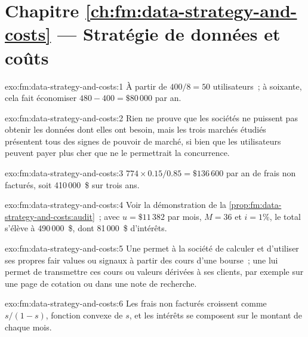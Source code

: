 \section*{Chapitre \ref{ch:fm:data-strategy-and-costs} --- Stratégie de données et coûts}

\begin{solution}{exo:fm:data-strategy-and-costs:1}
À partir de $400/8=50$ utilisateurs~; à soixante, cela fait économiser $480-400=\$80\,000$ par an.
\end{solution}

\begin{solution}{exo:fm:data-strategy-and-costs:2}
Rien ne prouve que les sociétés ne puissent pas obtenir les données dont elles ont besoin, mais les trois marchés étudiés présentent tous des signes de pouvoir de marché, si bien que les utilisateurs peuvent
payer plus cher que ne le permettrait la concurrence.
\end{solution}

\begin{solution}{exo:fm:data-strategy-and-costs:3}
$774\times0.15/0.85=\$136\,600$ par an de frais non facturés, soit 410\,000~\$ sur trois ans.
\end{solution}

\begin{solution}{exo:fm:data-strategy-and-costs:4}
Voir la démonstration de la \cref{prop:fm:data-strategy-and-costs:audit}~; avec $u=\$11\,382$ par mois, $M=36$ et $i=1\%$, le total s'élève à 490\,000~\$, dont
81\,000~\$ d'intérêts.
\end{solution}

\begin{solution}{exo:fm:data-strategy-and-costs:5}
Une  permet à la société de calculer et d'utiliser ses propres fair values ou signaux à partir des cours d'une bourse~; une  lui
permet de transmettre ces cours ou valeurs dérivées à ses clients, par exemple sur une page de cotation ou dans une note de recherche.
\end{solution}

\begin{solution}{exo:fm:data-strategy-and-costs:6}
Les frais non facturés croissent comme $s/(1-s)$, fonction convexe de $s$, et les intérêts se composent sur le montant de chaque mois.
\end{solution}

